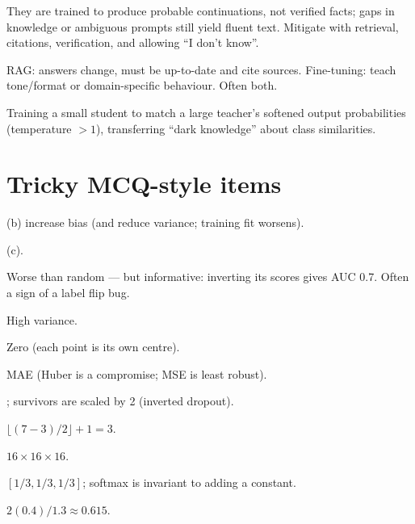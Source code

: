\A They are trained to produce probable continuations, not verified facts; gaps in knowledge or ambiguous prompts still yield fluent text. Mitigate with retrieval, citations, verification, and allowing ``I don't know''.

\A RAG: answers change, must be up-to-date and cite sources. Fine-tuning: teach tone/format or domain-specific behaviour. Often both.

\A Training a small student to match a large teacher's softened output probabilities (temperature $>1$), transferring ``dark knowledge'' about class similarities.

\section{Tricky MCQ-style items}
\A (b) increase bias (and reduce variance; training fit worsens).

\A (c).

\A Worse than random --- but informative: inverting its scores gives AUC 0.7. Often a sign of a label flip bug.

\A High variance.

\A Zero (each point is its own centre).

\A MAE (Huber is a compromise; MSE is least robust).

; survivors are scaled by 2 (inverted dropout).

\A $\lfloor(7-3)/2\rfloor+1=3$.

\A $16\times16\times16$.

\A $[1/3,1/3,1/3]$; softmax is invariant to adding a constant.

\A $2(0.4)/1.3\approx0.615$.

